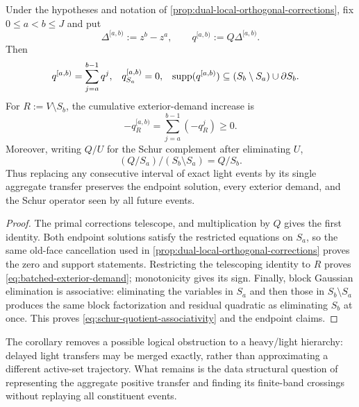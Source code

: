 \begin{corollary}
\label{cor:associative-dual-batching}
Under the hypotheses and notation of
\cref{prop:dual-local-orthogonal-corrections}, fix
$0\leq a<b\leq J$ and put
\begin{equation*}
 \Delta^{[a,b)}:=z^b-z^a,
 \qquad
 q^{[a,b)}:=Q\Delta^{[a,b)}.
\end{equation*}
Then
\begin{align}
 q^{[a,b)}
 &=\sum_{j=a}^{b-1}q^j,
 &q^{[a,b)}_{S_a}&=0,
 &\operatorname{supp}(q^{[a,b)})
 &\subseteq(S_b\setminus S_a)\cup\partial S_b.
 \label{eq:batched-dual-signature}
\end{align}
For $R:=V\setminus S_b$, the cumulative exterior-demand increase is
\begin{equation}
 -q_R^{[a,b)}
 =\sum_{j=a}^{b-1}(-q_R^j)\geq0.
 \label{eq:batched-exterior-demand}
\end{equation}
Moreover, writing $Q/U$ for the Schur complement after eliminating $U$,
\begin{equation}
 (Q/S_a)/(S_b\setminus S_a)=Q/S_b.
 \label{eq:schur-quotient-associativity}
\end{equation}
Thus replacing any consecutive interval of exact light events by its single
aggregate transfer preserves the endpoint solution, every exterior demand,
and the Schur operator seen by all future events.
\end{corollary}

\begin{proof}
The primal corrections telescope, and multiplication by $Q$ gives the first
identity.  Both endpoint solutions satisfy the restricted equations on
$S_a$, so the same old-face cancellation used in
\cref{prop:dual-local-orthogonal-corrections} proves the zero and support
statements.  Restricting the telescoping identity to $R$ proves
\cref{eq:batched-exterior-demand}; monotonicity gives its sign.  Finally,
block Gaussian elimination is associative: eliminating the variables in
$S_a$ and then those in $S_b\setminus S_a$ produces the same block factorization
and residual quadratic as eliminating $S_b$ at once.  This proves
\cref{eq:schur-quotient-associativity} and the endpoint claims.
\end{proof}

The corollary removes a possible logical obstruction to a heavy/light
hierarchy: delayed light transfers may be merged exactly, rather than
approximating a different active-set trajectory.  What remains is the data
structural question of representing the aggregate positive transfer and
finding its finite-band crossings without replaying all constituent events.
